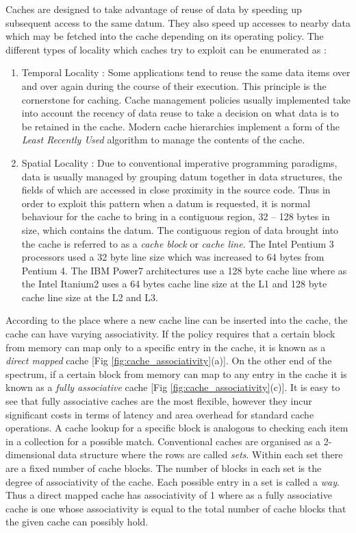 Caches are designed to take advantage of reuse of data by speeding up subsequent access to the same datum. They also speed up accesses to nearby data which may be fetched into the cache depending on its operating policy. The different types of locality which caches try to exploit can be enumerated as :

\begin{enumerate}
  \item Temporal Locality : Some applications tend to reuse the same data items over and over again during the course of their execution. This principle is the cornerstone for caching. Cache management policies usually implemented take into account the recency of data reuse to take a decision on what data is to be retained in the cache. Modern cache hierarchies implement a form of the \textit{Least Recently Used} algorithm to manage the contents of the cache.
  \item Spatial Locality : Due to conventional imperative programming paradigms, data is usually managed by grouping datum together in data structures, the fields of which are accessed in close proximity in the source code. Thus in order to exploit this pattern when a datum is requested, it is normal behaviour for the cache to bring in a contiguous region, 32 -- 128 bytes in size, which contains the datum. The contiguous region of data brought into the cache is referred to as a \textit{cache block} or \textit{cache line}. The Intel Pentium 3 processors used a 32 byte line size which was increased to 64 bytes from Pentium 4. The IBM Power7 architectures use a 128 byte cache line where as the Intel Itanium2 uses a 64 bytes cache line size at the L1 and 128 byte cache line size at the L2 and L3.
\end{enumerate}

According to the place where a new cache line can be inserted into the cache, the cache can have varying associativity. If the policy requires that a certain block from memory can map only to a specific entry in the cache, it is known as a \textit{direct mapped} cache [Fig \ref{fig:cache_associativity}(a)]. On the other end of the spectrum, if a certain block from memory can map to any entry in the cache it is known as a \textit{fully associative} cache [Fig \ref{fig:cache_associativity}(c)].  It is easy to see that fully associative caches are the most flexible, however they incur significant costs in terms of latency and area overhead for standard cache operations. A cache lookup for a specific block is analogous to checking each item in a collection for a possible match. Conventional caches are organised as a 2-dimensional data structure where the rows are called \textit{sets}. Within each set there are a fixed number of cache blocks. The number of blocks in each set is the degree of associativity of the cache. Each possible entry in a set is called a \textit{way}. Thus a direct mapped cache has associativity of 1 where as a fully associative cache is one whose associativity is equal to the total number of cache blocks that the given cache can possibly hold.  


